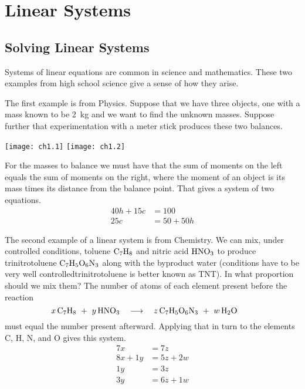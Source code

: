 \chapter{Linear Systems}
\section{Solving Linear Systems}
Systems of linear equations are common in science and mathematics.
These two examples from high school science \cite{Onan}
give a sense of how they arise.

The first example is from Physics.
Suppose that we have three objects,
one with a mass known to be 2~kg
and we want to find the unknown masses.
Suppose further that
experimentation with a meter stick produces these two balances.
\begin{center}
  \texttt{[image: ch1.1]}
  \qquad
  \texttt{[image: ch1.2]}
\end{center}
For the masses to balance we must have that
the sum of moments on the left equals the sum of moments on
the right, where the moment of an object is its mass times its distance 
from the balance point. 
That gives a system of two equations.
\begin{align*}
    40h+15c  &= 100  \\
    25c      &= 50+50h
\end{align*}

The second example of a linear system 
is from Chemistry.
We can mix, under controlled conditions, toluene $\hbox{C}_7\hbox{H}_8$ and 
nitric acid $\hbox{H}\hbox{N}\hbox{O}_3$ to produce
trinitrotoluene $\hbox{C}_7\hbox{H}_5\hbox{O}_6\hbox{N}_3$
along with the byproduct water
(conditions have to be very well controlled\Dash trinitrotoluene 
is better known as TNT).
In what proportion should we mix them?
The number of atoms of each element present before the reaction
\begin{equation*}
    x\,{\rm C}_7{\rm H}_8\ +\ y\,{\rm H}{\rm N}{\rm O}_3
    \quad\longrightarrow\quad
    z\,{\rm C}_7{\rm H}_5{\rm O}_6{\rm N}_3\ +\ w\,{\rm H}_2{\rm O}
\tag*{}\end{equation*}
must equal the number present afterward.
Applying that in turn to the elements C, H, N, and O gives
this system.
\begin{align*}
      7x      &= 7z  \\
      8x +1y  &= 5z+2w  \\
      1y      &= 3z  \\
      3y      &= 6z+1w
\end{align*}

